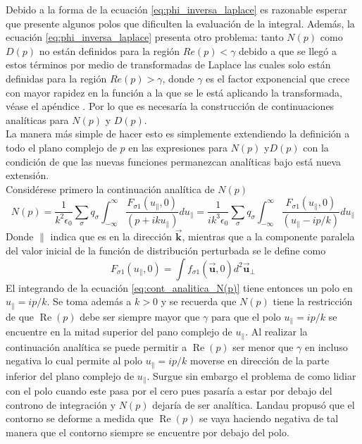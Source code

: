 \documentclass[../tesis_main_file.tex]{subfiles}
\begin{document}
Debido a la forma de la ecuación \ref{eq:phi_inversa_laplace} es razonable esperar que presente algunos polos que dificulten la evaluación de la integral. Además, la ecuación \ref{eq:phi_inversa_laplace} presenta otro problema: tanto $N(p)$ como $D(p)$ no están definidos para la región $Re(p) < \gamma$ debido a que se llegó a estos términos por medio de transformadas de Laplace las cuales solo están definidas para la región $Re(p) > \gamma$, donde $\gamma$ es el factor exponencial que crece con mayor rapidez en la función a la que se le está aplicando la transformada, véase el apéndice \notinsubfile{\ref{Ap:Laplace}}. Por lo que es necesaría la construcción de continuaciones analíticas para $N(p)$ y $D(p)$.\\
La manera más simple de hacer esto es simplemente extendiendo la definición a todo el plano complejo de $p$ en las expresiones para $N(p)$ y$D(p)$ con la condición de que las nuevas funciones permanezcan analíticas bajo está nueva extensión.\\
Considérese primero la continuación analítica de $N(p)$
\begin{equation}
\label{eq:cont_analitica_N(p)}
N(p) = \frac{1}{k^2 \epsilon_0}\sum_{\sigma}q_{\sigma}\int ^{\infty}_{-\infty}\frac{F_{\sigma 1}(u_{\parallel},0)}{(p +iku_{\parallel})}du_{\parallel}=\frac{1}{ik^3 \epsilon_0}\sum_{\sigma}q_{\sigma}\int ^{\infty}_{-\infty}\frac{F_{\sigma 1}(u_{\parallel},0)}{(u_{\parallel} -ip/k)}du_{\parallel}
\end{equation}
Donde $\parallel$ indica que es en la dirección $\overrightarrow{\textbf{k}}$, mientras que a la componente paralela del valor inicial de la función de distribución perturbada se le define como
\begin{equation}
F_{\sigma 1}(u_{\parallel},0)=\int f_{\sigma 1}(\overrightarrow{\textbf{u}},0)d^2\overrightarrow{\textbf{u}}_{\perp}
\end{equation}
El integrando de la ecuación \ref{eq:cont_analitica_N(p)} tiene entonces un polo en $u_{\parallel}=ip/k$. Se toma además a $k>0$ y se recuerda que $N(p)$ tiene la restricción de que $\operatorname{Re}(p)$ debe ser siempre mayor que $\gamma$ para que el polo $u_{\parallel}=ip/k$ se encuentre en la mitad superior del pano complejo de $u_{\parallel}$. Al realizar la continuación analítica se puede permitir a $\operatorname{Re}(p)$ ser menor que $\gamma$ en incluso negativa lo cual permite al polo $u_{\parallel}=ip/k$ moverse en dirección de la parte inferior del plano complejo de $u_{\parallel}$. Surgue sin embargo el problema de como lidiar con el polo cuando este pasa por el cero pues pasaría a estar por debajo del controno de integración y $N(p)$ dejaría de ser analítica. Landau propusó que el contorno se deforme a medida que $\operatorname{Re}(p)$ se vaya haciendo negativa de tal manera que el contorno siempre se encuentre por debajo del polo.\cite{bellan2008fundamentals}\\
\end{document}
